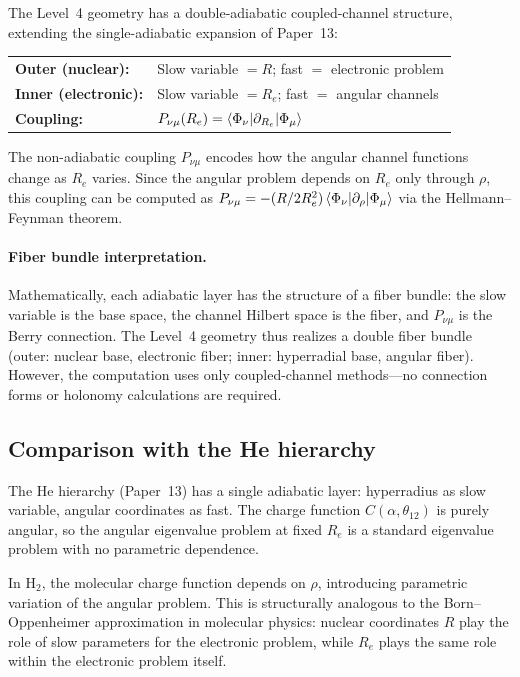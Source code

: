 \documentclass[aps,pra,twocolumn,superscriptaddress,longbibliography]{revtex4-2}
\begin{document}
The Level~4 geometry has a double-adiabatic coupled-channel structure,
extending the single-adiabatic expansion of Paper~13:

\medskip
\noindent
\begin{tabular}{ll}
\textbf{Outer (nuclear):} & Slow variable $= R$;
  fast $=$ electronic problem \\
\textbf{Inner (electronic):} & Slow variable $= R_e$;
  fast $=$ angular channels \\
\textbf{Coupling:} & $P_{\nu\mu}(R_e) =
  \braket{\Phi_\nu|\partial_{R_e}|\Phi_\mu}$
\end{tabular}

\medskip
\noindent
The non-adiabatic coupling $P_{\nu\mu}$ encodes how the angular
channel functions change as $R_e$ varies.  Since the angular problem
depends on $R_e$ only through $\rho$, this coupling can be computed
as $P_{\nu\mu} = -(R/2R_e^2)\braket{\Phi_\nu|\partial_\rho|\Phi_\mu}$
via the Hellmann--Feynman theorem.

\paragraph{Fiber bundle interpretation.}
Mathematically, each adiabatic layer has the structure of a fiber
bundle: the slow variable is the base space, the channel Hilbert
space is the fiber, and $P_{\nu\mu}$ is the Berry connection.  The
Level~4 geometry thus realizes a double fiber bundle (outer: nuclear
base, electronic fiber; inner: hyperradial base, angular fiber).
However, the computation uses only coupled-channel methods---no
connection forms or holonomy calculations are required.

\subsection{Comparison with the He hierarchy}

The He hierarchy (Paper~13) has a single adiabatic layer: hyperradius
as slow variable, angular coordinates as fast.  The charge function
$C(\alpha,\theta_{12})$ is purely angular, so the angular eigenvalue
problem at fixed $R_e$ is a standard eigenvalue problem with no
parametric dependence.

In H$_2$, the molecular charge function depends on $\rho$, introducing
parametric variation of the angular problem.  This is structurally
analogous to the Born--Oppenheimer approximation in molecular physics:
nuclear coordinates $R$ play the role of slow parameters for the
electronic problem, while $R_e$ plays the same role within the
electronic problem itself.
\end{document}

